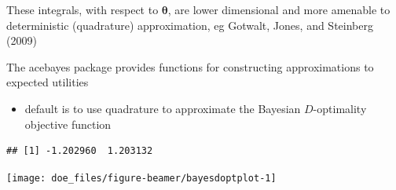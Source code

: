 \documentclass[
  ignorenonframetext,
]{beamer}
\newenvironment{Shaded}{\begin{snugshade}}{\end{snugshade}}
\newcommand{\AttributeTok}[1]{\textcolor[rgb]{0.77,0.63,0.00}{#1}}
\newcommand{\ControlFlowTok}[1]{\textcolor[rgb]{0.13,0.29,0.53}{\textbf{#1}}}
\newcommand{\DecValTok}[1]{\textcolor[rgb]{0.00,0.00,0.81}{#1}}
\newcommand{\FunctionTok}[1]{\textcolor[rgb]{0.00,0.00,0.00}{#1}}
\newcommand{\NormalTok}[1]{#1}
\newcommand{\OtherTok}[1]{\textcolor[rgb]{0.56,0.35,0.01}{#1}}
\newcommand{\SpecialCharTok}[1]{\textcolor[rgb]{0.00,0.00,0.00}{#1}}
\providecommand{\tightlist}{%
  \setlength{\itemsep}{0pt}\setlength{\parskip}{0pt}}
\begin{document}
\begin{frame}[fragile]{}
\protect\hypertarget{section-31}{}
These integrals, with respect to \(\boldsymbol{\theta}\), are lower
dimensional and more amenable to deterministic (quadrature)
approximation, eg Gotwalt, Jones, and Steinberg (2009)

The acebayes package provides functions for constructing approximations
to expected utilities

\begin{itemize}
\tightlist
\item
  default is to use quadrature to approximate the Bayesian
  \(D\)-optimality objective function
\end{itemize}

\begin{Shaded}
\end{Shaded}

\begin{verbatim}
## [1] -1.202960  1.203132
\end{verbatim}

\begin{center}\texttt{[image: doe\_files/figure-beamer/bayesdoptplot-1]} \end{center}
\end{frame}
\end{document}

